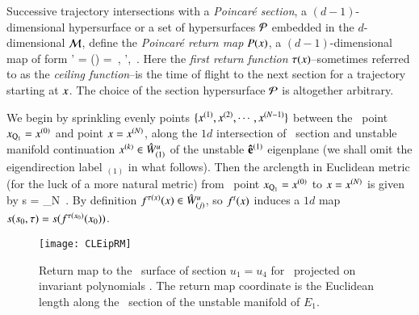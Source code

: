 Successive trajectory intersections with a {\em Poincar\'e
section}, a $(d-1)$-dim\-ens\-ion\-al hypersurface
or a set of
hypersurfaces ${\cal P}$ embedded in the $d$-dim\-ens\-ion\-al
{\statesp} ${\cal M}$, define the {\em Poincar\'e return map}
$P({x})$, a $(d-1)$-dim\-ens\-ion\-al map of form
\beq
\ssp' = \PoincM({\ssp})
          =  \flow{\tau(\ssp)}{\ssp}
\,,\qquad
\ssp', \ssp \in \PoincS
\,.
Here the {\em first return function} $\tau(x)$--sometimes
referred to as the {\em ceiling function}--is the time of
flight to the next section for a trajectory starting at $x$.
The choice of the section hypersurface ${\cal P}$ is altogether
arbitrary. 

We begin by sprinkling evenly points
$\{x^{(1)},x^{(2)},\cdots,x^{(N-1)}\}$ between the
\reqv\ point $x_{\mathrm{Q}_{1}}=x^{(0)}$ and point  $x=
x^{(N)}$, along the $1d$ intersection of \Poincare\ section and
unstable manifold continuation $x^{(k)} \in \hat{W}^u_{(1)}$ of the unstable ${\bf
\hat{e}}^{(1)}$ eigen\-plane (we shall omit the
eigen\-direction label ${}_{(1)}$ in what follows). Then the
arclength in Euclidean metric (for the luck of a more natural metric)
from \reqv\ point $x_{\mathrm{Q}_{1}}=x^{(0)}$ to $x=
x^{(N)}$ is given by
\beq
s = \lim_{N\to\infty}
\,.
By definition $f^{\tau(x)}(x) \in \hat{W}^u_{(j)}$, so
$f^t(x)$ induces a $1d$ map $s(s_0,\tau) =
s(f^{\tau({x_0})}({x_0}))$.

\begin{figure}[ht]
\begin{center}
\texttt{[image: CLEipRM]}
\end{center}
\caption{
Return map to the \Poincare\ surface of section $u_1=u_4$ for
\cLe\ projected on invariant polynomials .
The return map coordinate is the Euclidean length along the
\Poincare\ section of the unstable manifold of $E_1$.
    }
\label{fig:CLEipRM}
\end{figure}

